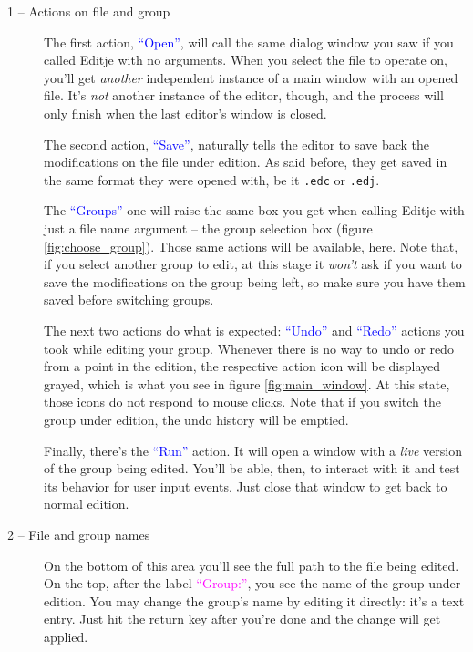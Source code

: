 \documentclass[a4paper]{profusion}
\newcommand{\GUIIcon}[1]{\textcolor{blue}{#1}}    %
\newcommand{\GUILabel}[1]{\textcolor{magenta}{#1}}
\begin{document}
\begin{description}
\item[1 -- Actions on file and group]
  The first action, \GUIIcon{``Open''}, will call the same dialog
  window you saw if you called Editje with no arguments. When you
  select the file to operate on, you'll get \emph{another} independent
  instance of a main window with an opened file. It's \emph{not}
  another instance of the editor, though, and the process will only
  finish when the last editor's window is closed.

  The second action, \GUIIcon{``Save''}, naturally tells the editor to
  save back the modifications on the file under edition. As said
  before, they get saved in the same format they were opened with, be
  it \texttt{.edc} or \texttt{.edj}.

  The \GUIIcon{``Groups''} one will raise the same box you get when
  calling Editje with just a file name argument -- the group selection
  box (figure \ref{fig:choose_group}). Those same actions will be
  available, here. Note that, if you select another group to edit, at
  this stage it \emph{won't} ask if you want to save the modifications
  on the group being left, so make sure you have them saved before
  switching groups.


  The next two actions do what is expected: \GUIIcon{``Undo''} and
  \GUIIcon{``Redo''} actions you took while editing your
  group. Whenever there is no way to undo or redo from a point in the
  edition, the respective action icon will be displayed grayed, which
  is what you see in figure \ref{fig:main_window}. At this state,
  those icons do not respond to mouse clicks. Note that if you switch
  the group under edition, the undo history will be emptied.

  Finally, there's the \GUIIcon{``Run''} action. It will open a window
  with a \emph{live} version of the group being edited. You'll be
  able, then, to interact with it and test its behavior for user input
  events. Just close that window to get back to normal edition.

\item[2 -- File and group names] On the bottom of this area you'll see
  the full path to the file being edited. On the top, after the label
  \GUILabel{``Group:''}, you see the name of the group under
  edition. You may change the group's name by editing it directly:
  it's a text entry. Just hit the return key after you're done and the
  change will get applied.


\end{description}
\end{document}
